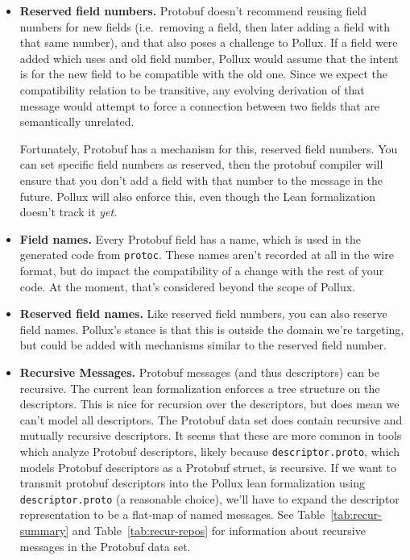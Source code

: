 \begin{itemize}
\item \textbf{Reserved field numbers.} Protobuf doesn't recommend reusing field
  numbers for new fields (i.e.\ removing a field, then later adding a field with
  that same number), and that also poses a challenge to Pollux. If a field were
  added which uses and old field number, Pollux would assume that the intent is
  for the new field to be compatible with the old one. Since we expect the
  compatibility relation to be transitive, any evolving derivation of that
  message would attempt to force a connection between two fields that are
  semantically unrelated.

  Fortunately, Protobuf has a mechanism for this, reserved field numbers. You
  can set specific field numbers as reserved, then the protobuf compiler will
  ensure that you don't add a field with that number to the message in the
  future. Pollux will also enforce this, even though the Lean formalization
  doesn't track it \emph{yet}.

\item \textbf{Field names.} Every Protobuf field has a name, which is used in
  the generated code from \texttt{protoc}. These names aren't recorded at all in
  the wire format, but do impact the compatibility of a change with the rest of
  your code. At the moment, that's considered beyond the scope of Pollux.

\item \textbf{Reserved field names.} Like reserved field numbers, you can also
  reserve field names. Pollux's stance is that this is outside the domain we're
  targeting, but could be added with mechanisms similar to the reserved field
  number.

\item \textbf{Recursive Messages.} Protobuf messages (and thus descriptors) can
  be recursive. The current lean formalization enforces a tree structure on the
  descriptors. This is nice for recursion over the descriptors, but does mean we
  can't model all descriptors. The Protobuf data set does contain recursive and
  mutually recursive descriptors. It seems that these are more common in tools
  which analyze Protobuf descriptors, likely because \texttt{descriptor.proto},
  which models Protobuf descriptors as a Protobuf struct, is recursive. If we
  want to transmit protobuf descriptors into the Pollux lean formalization using
  \texttt{descriptor.proto} (a reasonable choice), we'll have to expand the
  descriptor representation to be a flat-map of named messages. See
  Table~\ref{tab:recur-summary} and Table~\ref{tab:recur-repos} for information
  about recursive messages in the Protobuf data set.


\end{itemize}

